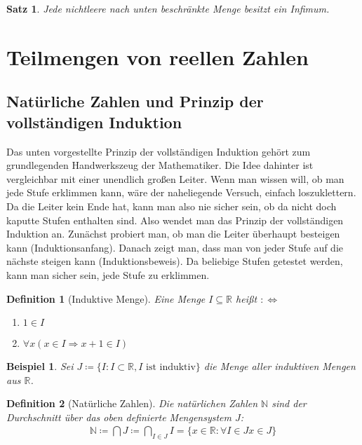 \documentclass[ngerman,titlepage,twoside, parskip=half*]{scrreprt}
\newcommand*{\N}{\mathbb{N}}
\newcommand*{\R}{\mathbb{R}}
\newcommand*{\perdef}{:\Leftrightarrow}
\theoremstyle{break}
\newtheorem{theorem}{Satz}[section]
\newtheorem{definition}{Definition}[chapter]
\theoremstyle{nonumberbreak}
\newtheorem{beispiel}{Beispiel}
\newcommand*{\highl}[2][]{\textbf{\boldmath{#2}}%
  \ifthenelse{\equal{#1}{}}{\index{#2}}{\index{#1}}%
}
\begin{document}
\begin{theorem}
  Jede nichtleere nach unten beschränkte Menge besitzt ein Infimum.
\end{theorem}

\section{Teilmengen von reellen Zahlen}
\subsection{Natürliche Zahlen und Prinzip der vollständigen Induktion}
Das unten vorgestellte Prinzip der vollständigen Induktion gehört zum
grundlegenden Handwerkszeug der Mathematiker. Die Idee dahinter ist
vergleichbar mit einer unendlich großen Leiter. Wenn man wissen will, ob man
jede Stufe erklimmen kann, wäre der naheliegende Versuch, einfach
loszuklettern. Da die Leiter kein Ende hat, kann man also nie sicher sein, ob
da nicht doch kaputte Stufen enthalten sind. Also wendet man das Prinzip der
vollständigen Induktion an. Zunächst probiert man, ob man die Leiter überhaupt
besteigen kann (Induktionsanfang). Danach zeigt man, dass man von jeder Stufe
auf die nächste steigen kann (Induktionsbeweis). Da beliebige Stufen getestet
werden, kann man sicher sein, jede Stufe zu erklimmen.

\begin{definition}[Induktive Menge]
  Eine Menge $I \subseteq \R$ heißt \highl{induktiv}$\perdef$
  \begin{enumerate}
  \item $1 \in I$
  \item $\forall x (x \in I \Rightarrow x+1 \in I)$
  \end{enumerate}
\end{definition}

\begin{beispiel}
  Sei $J\coloneqq\{I\colon I \subset \R, I \text{ ist induktiv}\}$ die
  Menge aller induktiven Mengen aus $\R$.
\end{beispiel}

\begin{definition}[Natürliche Zahlen]
  Die natürlichen Zahlen $\N$ sind der Durchschnitt über das oben definierte
  Mengensystem $J$:
  \begin{gather*}
    \N \coloneqq \bigcap J \coloneqq \bigcap_{I \in J} I = \{x \in \R \colon
  \forall I \in J x \in J\}
  \end{gather*}
\end{definition}
\end{document}
